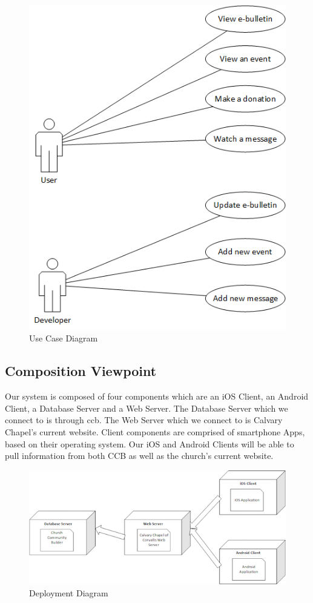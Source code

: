 \documentclass[letterpaper,10pt,draftclsnofoot,onecolumn,titlepage]{IEEEtran}
\begin{document}
		\begin{figure}[H]
			\centering
			\includegraphics[natwidth=462, natheight=585]{UseCase.png}
			\caption{Use Case Diagram}
			\label{fig:usecase}
		\end{figure}


		\subsection{Composition Viewpoint}
			Our system is composed of four components which are an \gls{iOS} Client, an \gls{Android} Client, a Database Server and a Web Server.
			The Database Server which we connect to is through \gls{ccb}.
			The Web Server which we connect to is Calvary Chapel's current website.
			Client components are comprised of smartphone \glspl{App}, based on their operating system.
			Our \gls{iOS} and \gls{Android} Clients will be able to pull information from both CCB as well as the church's current website.

		\begin{figure}[H]
			\centering
			\includegraphics[natwidth=552, natheight=245]{Deployment.png}
			\caption{Deployment Diagram}
			\label{fig:deployment}
		\end{figure}
\end{document}
